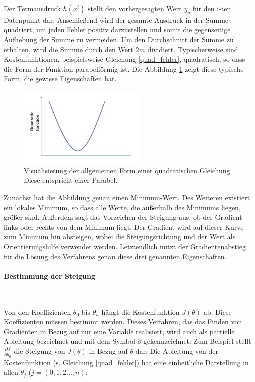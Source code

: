 Der Termausdruck $h(x^i)$ stellt den vorhergesagten Wert $y_p$ für den i-ten Datenpunkt dar. Anschließend wird der gesamte Ausdruck in der Summe quadriert, um jeden Fehler positiv darzustellen und somit die gegenseitige Aufhebung der Summe zu vermeiden. Um den Durchschnitt der Summe zu erhalten, wird die Summe durch den Wert $2m$ dividiert. Typischerweise sind Kostenfunktionen, beispielsweise Gleichung \ref{quad_fehler}, quadratisch, so dass die Form der Funktion parabelförmig ist. Die Abbildung \ref{parabel} zeigt diese typische Form, die gewisse Eigenschaften hat.


\begin{figure}[h!]
	\centering
	\includegraphics[width=0.55\textwidth]{bilder/quadratic_func.PNG}
	\caption{Visualisierung der allgemeinen Form einer quadratischen Gleichung. Diese entspricht einer Parabel\cite{IntroML}.}
	\label{parabel}
\end{figure}

\newpage
Zunächst hat die Abbildung genau einen Minimum-Wert. Des Weiteren existiert ein lokales Minimum, so dass alle Werte, die außerhalb des Minimums liegen, größer sind. Außerdem sagt das Vorzeichen der Steigung aus, ob der Gradient links oder rechts von dem Minimum liegt. Der Gradient wird auf dieser Kurve zum Minimum hin absteigen, wobei die Steigungsrichtung und der Wert als Orientierungshilfe verwendet werden. Letztendlich nutzt der Gradientenabstieg für die Lösung des Verfahrens genau diese drei genannten Eigenschaften. 





\paragraph{Bestimmung der Steigung}

~\newline

Von den Koeffizienten $\theta_0$ bis $\theta_n$ hängt die Kostenfunktion $J(\theta)$ ab. Diese Koeffizienten müssen bestimmt werden. Dieses Verfahren, das das Finden von Gradienten in Bezug auf nur eine Variable realisiert, wird auch als partielle Ableitung bezeichnet und mit dem Symbol $\partial$ gekennzeichnet. Zum Beispiel stellt $\frac{\partial J}{\partial \theta_0}$ die Steigung von $J(\theta)$ in Bezug auf $\theta$ dar.
Die Ableitung von der Kostenfunktion (s. Gleichung \ref{quad_fehler}) hat eine einheitliche Darstellung in allen $\theta_j$ ($j = (0,1,2...,n)$:

